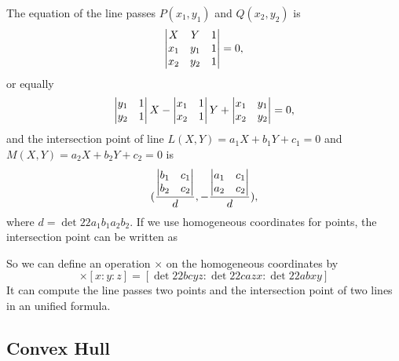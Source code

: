 The equation of the line passes $P(x_1,y_1)$ and $Q(x_2,y_2)$ is
$$\left|\begin{matrix}X&Y&1\cr x_1&y_1&1\cr x_2&y_2&1\end{matrix}\right|=0,$$
or equally
$$\left|\begin{matrix}y_1&1\cr y_2&1\end{matrix}\right|X
-\left|\begin{matrix}x_1&1\cr x_2&1\end{matrix}\right|Y
+\left|\begin{matrix}x_1&y_1\cr x_2&y_2\end{matrix}\right|=0,$$
and the intersection point of line $L(X,Y)=a_1X + b_1Y + c_1=0$ and $M(X,Y)=a_2X + b_2Y + c_2=0$ is
$$({{\left|\begin{matrix}b_1&c_1\cr b_2&c_2\end{matrix}\right|}\over d},
-{{\left|\begin{matrix}a_1&c_1\cr a_2&c_2\end{matrix}\right|}\over d}),$$
where $d = \det22{a_1}{b_1}{a_2}{b_2}$.
If we use homogeneous coordinates for points, the intersection point can be written as
\begin{equation*}
[ \det22{b_1}{c_1}{b_2}{c_2} :
- \det22{a_1}{c_1}{a_2}{c_2} :
  \det22{a_1}{b_1}{a_2}{b_2} ]
\end{equation*}

So we can define an operation $\times$ on the homogeneous coordinates by
\begin{equation*}
[a : b : c] \times [x : y : z]
= [ {\det22 b c y z} : {\det22 c a z x} : {\det22 a b x y} ]
\end{equation*}
It can compute the line passes two points and the intersection point of two
lines in an unified formula.

\subsection{Convex Hull}
